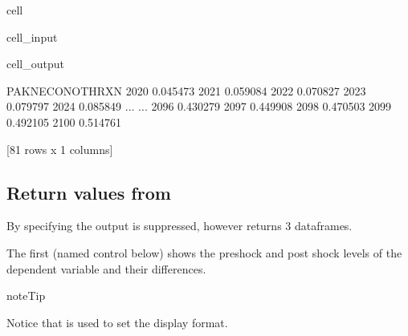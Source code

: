 \documentclass[letterpaper,10pt,english]{jupyterBook}
\begin{document}
\begin{sphinxuseclass}{cell}\begin{sphinxVerbatimInput}

\begin{sphinxuseclass}{cell_input}
\begin{sphinxVerbatim}[commandchars=\\\{\}]
\PYG{p}{[}\PYG{p}{]}
\end{sphinxVerbatim}

\end{sphinxuseclass}\end{sphinxVerbatimInput}
\begin{sphinxVerbatimOutput}

\begin{sphinxuseclass}{cell_output}
\begin{sphinxVerbatim}[commandchars=\\\{\}]
      PAKNECONOTHRXN
2020        0.045473
2021        0.059084
2022        0.070827
2023        0.079797
2024        0.085849
...              ...
2096        0.430279
2097        0.449908
2098        0.470503
2099        0.492105
2100        0.514761

[81 rows x 1 columns]
\end{sphinxVerbatim}

\end{sphinxuseclass}\end{sphinxVerbatimOutput}

\end{sphinxuseclass}

\subsection{Return values from }
\label{\detokenize{content/06_ModelAnalytics/Attribution:return-values-from-dekomp}}
\sphinxAtStartPar
By specifying  the output is suppressed, however  returns 3 dataframes.

\sphinxAtStartPar
The first (named control below) shows the pre\sphinxhyphen{}shock and post shock levels of the dependent variable and their differences.

\begin{sphinxadmonition}{note}{Tip}

\sphinxAtStartPar
Notice that  is used to set the display format.
\end{sphinxadmonition}
\end{document}
